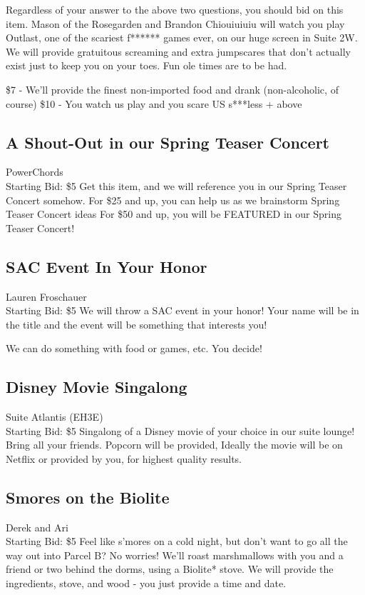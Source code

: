 \documentclass[11pt]{article}
\begin{document}
Regardless of your answer to the above two questions, you should bid on this item. Mason of the Rosegarden and Brandon Chiouiuiuiu will watch you play Outlast, one of the scariest f****** games ever, on our huge screen in Suite 2W. We will provide gratuitous screaming and extra jumpscares that don't actually exist just to keep you on your toes. Fun ole times are to be had.

\$7 - We'll provide the finest non-imported food and drank (non-alcoholic, of course) 
\$10 - You watch us play and you scare US s***less + above
\subsection{A Shout-Out in our Spring Teaser Concert}
PowerChords
\\
Starting Bid: \$5
\newline
Get this item, and we will reference you in our Spring Teaser Concert somehow.
For \$25 and up, you can help us as we brainstorm Spring Teaser Concert ideas
For \$50 and up, you will be FEATURED in our Spring Teaser Concert!
\subsection{SAC Event In Your Honor}
Lauren Froschauer
\\
Starting Bid: \$5
\newline
We will throw a SAC event in your honor! Your name will be in the title and the event will be something that interests you!

We can do something with food or games, etc. You decide!
\subsection{Disney Movie Singalong}
Suite Atlantis (EH3E)
\\
Starting Bid: \$5
\newline
Singalong of a Disney movie of your choice in our suite lounge! Bring all your friends. Popcorn will be provided, Ideally the movie will be on Netflix or provided by you, for highest quality results.
\subsection{Smores on the Biolite}
Derek and Ari
\\
Starting Bid: \$5
\newline
Feel like s'mores on a cold night, but don't want to go all the way out into Parcel B? No worries! We'll roast marshmallows with you and a friend or two behind the dorms, using a Biolite* stove. We will provide the ingredients, stove, and wood - you just provide a time and date.
\end{document}
